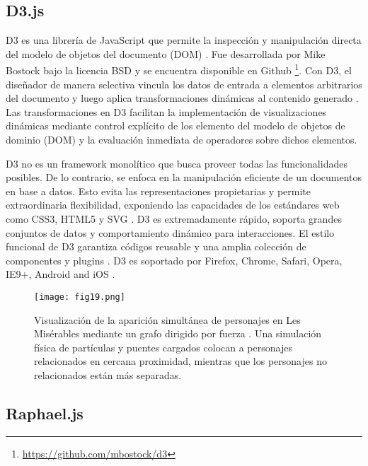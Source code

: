 \subsection{D3.js}

D3 es una librería de JavaScript que permite la inspección y manipulación directa del modelo de objetos del documento (DOM) \cite{D3JS}. Fue desarrollada por Mike Bostock bajo la licencia BSD y se encuentra disponible en Github \footnote{\url{https://github.com/mbostock/d3}}. Con D3, el diseñador de manera selectiva vincula los datos de entrada a elementos arbitrarios del documento y luego aplica transformaciones dinámicas al contenido generado \cite{Bos11}. Las transformaciones en D3 facilitan la implementación de visualizaciones dinámicas mediante control explícito de los elemento del modelo de objetos de dominio (DOM) y la evaluación inmediata de operadores sobre dichos elementos.

D3 no es un framework monolítico que busca proveer todas las funcionalidades posibles. De lo contrario, se enfoca en la manipulación eficiente de un documentos en base a datos. Esto evita las representaciones propietarias y permite extraordinaria flexibilidad, exponiendo las capacidades de los estándares web como CSS3, HTML5 y SVG . D3 es extremadamente rápido, soporta grandes conjuntos de datos y comportamiento dinámico para interacciones. El estilo funcional de D3 garantiza códigos reusable y una amplia colección de componentes y plugins \cite{D3JS}. D3 es soportado por Firefox, Chrome, Safari, Opera, IE9+, Android and iOS \cite{GitD3}.

\begin{figure}[htp]
  \centering
  \texttt{[image: fig19.png]}
  \caption[Visualización de la aparición simultánea de personajes en Les Misérables usando D3.js]{Visualización de la aparición simultánea de personajes en Les Misérables mediante un grafo dirigido por fuerza \protect\footnotemark. Una simulación física de partículas y puentes cargados colocan a personajes relacionados en cercana proximidad, mientras que los personajes no relacionados están más separadas.}
  \label{fig:fig19}
\end{figure}


\subsection{Raphael.js}

